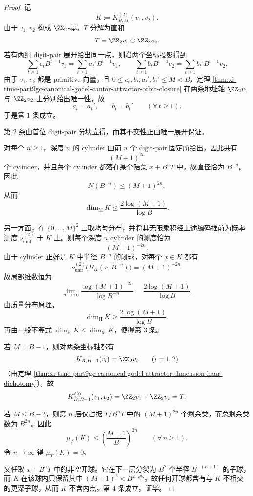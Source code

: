 \begin{proof}
记
\[
K:=K_{B,M}^{(2)}(v_1,v_2).
\]
由于 \(v_1,v_2\) 构成 \(\ZZ_2\)-基，\(T\) 分解为直和
\[
T=\ZZ_2v_1\oplus \ZZ_2v_2.
\]
若有两组 digit-pair 展开给出同一点，则沿两个坐标投影得到
\[
\sum_{t\ge 1}a_tB^{t-1}v_1=\sum_{t\ge 1}a_t'B^{t-1}v_1,
\qquad
\sum_{t\ge 1}b_tB^{t-1}v_2=\sum_{t\ge 1}b_t'B^{t-1}v_2.
\]
由于 \(v_1,v_2\) 都是 primitive 向量，且 \(0\le a_t,b_t,a_t',b_t'\le M<B\)，定理 \ref{thm:xi-time-part9gc-canonical-godel-cantor-attractor-orbit-closure} 在两条地址轴 \(\ZZ_2v_1\) 与 \(\ZZ_2v_2\) 上分别给出唯一性，故
\[
a_t=a_t',\qquad b_t=b_t'
\qquad(\forall\,t\ge 1).
\]
于是第 \(1\) 条成立。

第 \(2\) 条由首位 digit-pair 分块立得，而其不交性正由唯一展开保证。

对每个 \(n\ge 1\)，深度 \(n\) 的 cylinder 由前 \(n\) 个 digit-pair 固定所给出，因此共有
\[
(M+1)^{2n}
\]
个 cylinder，并且每个 cylinder 都落在某个陪集 \(x+B^nT\) 中，故直径恰为 \(B^{-n}\)。因此
\[
N(B^{-n})\le (M+1)^{2n},
\]
从而
\[
\dim_{\mathrm M}K\le \frac{2\log(M+1)}{\log B}.
\]

另一方面，在 \(\{0,\dots,M\}^2\) 上取均匀分布，并将其无限乘积经上述编码推前为概率测度 \(\nu_{\mathrm{unif}}^{(2)}\) 于 \(K\) 上。则每个深度 \(n\) cylinder 的测度恰为
\[
(M+1)^{-2n}.
\]
由于 cylinder 正好是 \(K\) 中半径 \(B^{-n}\) 的闭球，对每个 \(x\in K\) 都有
\[
\nu_{\mathrm{unif}}^{(2)}\bigl(B_K(x,B^{-n})\bigr)=(M+1)^{-2n}.
\]
故局部维数恒为
\[
\lim_{n\to\infty}\frac{\log (M+1)^{-2n}}{\log B^{-n}}
=
\frac{2\log(M+1)}{\log B}.
\]
由质量分布原理，
\[
\dim_{\mathrm H}K\ge \frac{2\log(M+1)}{\log B}.
\]
再由一般不等式 \(\dim_{\mathrm H}K\le \dim_{\mathrm M}K\)，便得第 \(3\) 条。

若 \(M=B-1\)，则对两条坐标轴都有
\[
K_{B,B-1}(v_i)=\ZZ_2v_i
\qquad(i=1,2)
\]
（由定理 \ref{thm:xi-time-part9gc-canonical-godel-attractor-dimension-haar-dichotomy}），故
\[
K_{B,B-1}^{(2)}(v_1,v_2)=\ZZ_2v_1+\ZZ_2v_2=T.
\]

若 \(M\le B-2\)，则第 \(n\) 层仅占据 \(T/B^nT\) 中的 \((M+1)^{2n}\) 个剩余类，而总剩余类数为 \(B^{2n}\)。因此
\[
\mu_T(K)\le \left(\frac{M+1}{B}\right)^{2n}
\qquad(\forall\,n\ge 1).
\]
令 \(n\to\infty\) 得 \(\mu_T(K)=0\)。

又任取 \(x+B^nT\) 中的非空开球。它在下一层分裂为 \(B^2\) 个半径 \(B^{-(n+1)}\) 的子球，而 \(K\) 在该球内只保留其中 \((M+1)^2<B^2\) 个。故任何开球都含有与 \(K\) 不相交的更深子球，从而 \(K\) 不含内点。第 \(4\) 条成立。证毕。
\end{proof}

